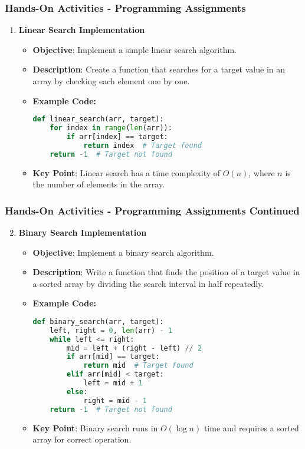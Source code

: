 \documentclass[aspectratio=169]{beamer}
\begin{document}
\begin{frame}[fragile]
    \frametitle{Hands-On Activities - Programming Assignments}
    \begin{enumerate}
        \item \textbf{Linear Search Implementation}
            \begin{itemize}
                \item \textbf{Objective}: Implement a simple linear search algorithm.
                \item \textbf{Description}: Create a function that searches for a target value in an array by checking each element one by one.
                \item \textbf{Example Code:}
                \begin{lstlisting}[language=Python]
def linear_search(arr, target):
    for index in range(len(arr)):
        if arr[index] == target:
            return index  # Target found
    return -1  # Target not found
                \end{lstlisting}
                \item \textbf{Key Point}: Linear search has a time complexity of $O(n)$, where $n$ is the number of elements in the array.
            \end{itemize}
    \end{enumerate}
\end{frame}

\begin{frame}[fragile]
    \frametitle{Hands-On Activities - Programming Assignments Continued}
    \begin{enumerate}
        \setcounter{enumi}{1}
        \item \textbf{Binary Search Implementation}
            \begin{itemize}
                \item \textbf{Objective}: Implement a binary search algorithm.
                \item \textbf{Description}: Write a function that finds the position of a target value in a sorted array by dividing the search interval in half repeatedly.
                \item \textbf{Example Code:}
                \begin{lstlisting}[language=Python]
def binary_search(arr, target):
    left, right = 0, len(arr) - 1
    while left <= right:
        mid = left + (right - left) // 2
        if arr[mid] == target:
            return mid  # Target found
        elif arr[mid] < target:
            left = mid + 1
        else:
            right = mid - 1
    return -1  # Target not found
                \end{lstlisting}
                \item \textbf{Key Point}: Binary search runs in $O(\log n)$ time and requires a sorted array for correct operation.
            \end{itemize}
    \end{enumerate}
\end{frame}
\end{document}

